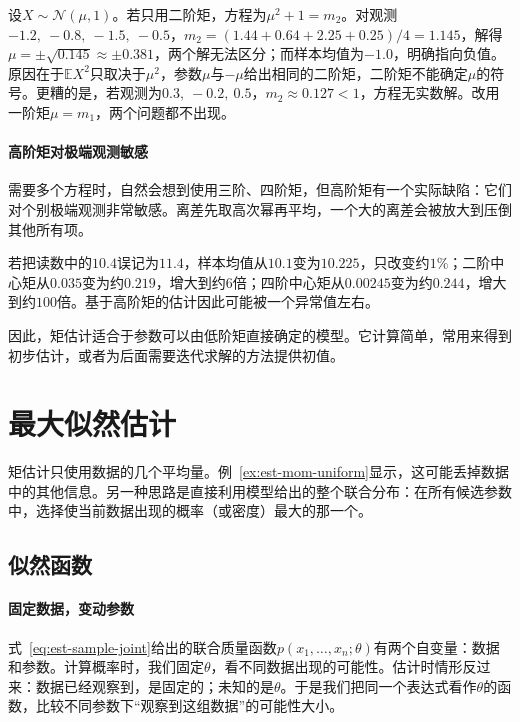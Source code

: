 \begin{example}[只用二阶矩丢失符号]
\label{ex:est-mom-sign}
设$X\sim\mathcal{N}(\mu,1)$。若只用二阶矩，方程为$\mu^2+1=m_2$。对观测$-1.2,\ -0.8,\ -1.5,\ -0.5$，$m_2=(1.44+0.64+2.25+0.25)/4=1.145$，解得$\mu=\pm\sqrt{0.145}\approx\pm0.381$，两个解无法区分；而样本均值为$-1.0$，明确指向负值。原因在于$\mathbb{E}X^2$只取决于$\mu^2$，参数$\mu$与$-\mu$给出相同的二阶矩，二阶矩不能确定$\mu$的符号。更糟的是，若观测为$0.3,\ -0.2,\ 0.5$，$m_2\approx0.127<1$，方程无实数解。改用一阶矩$\mu=m_1$，两个问题都不出现。
\end{example}

\paragraph{高阶矩对极端观测敏感}
需要多个方程时，自然会想到使用三阶、四阶矩，但高阶矩有一个实际缺陷：它们对个别极端观测非常敏感。离差先取高次幂再平均，一个大的离差会被放大到压倒其他所有项。

\begin{example}[一个读数的错误]
\label{ex:est-moment-sensitivity}
若把读数中的$10.4$误记为$11.4$，样本均值从$10.1$变为$10.225$，只改变约$1\%$；二阶中心矩从$0.035$变为约$0.219$，增大到约$6$倍；四阶中心矩从$0.00245$变为约$0.244$，增大到约$100$倍。基于高阶矩的估计因此可能被一个异常值左右。
\end{example}

因此，矩估计适合于参数可以由低阶矩直接确定的模型。它计算简单，常用来得到初步估计，或者为后面需要迭代求解的方法提供初值。

\section{最大似然估计}
\label{sec:est-mle}

矩估计只使用数据的几个平均量。例~\ref{ex:est-mom-uniform}显示，这可能丢掉数据中的其他信息。另一种思路是直接利用模型给出的整个联合分布：在所有候选参数中，选择使当前数据出现的概率（或密度）最大的那一个。

\subsection{似然函数}

\paragraph{固定数据，变动参数}
式~\eqref{eq:est-sample-joint}给出的联合质量函数$p(x_1,\dots,x_n;\theta)$有两个自变量：数据和参数。计算概率时，我们固定$\theta$，看不同数据出现的可能性。估计时情形反过来：数据已经观察到，是固定的；未知的是$\theta$。于是我们把同一个表达式看作$\theta$的函数，比较不同参数下“观察到这组数据”的可能性大小。

